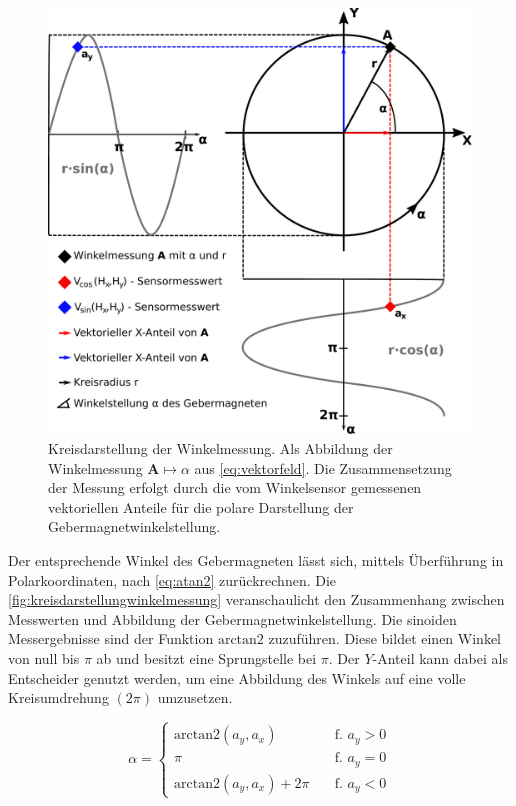 \clearpage


\begin{figure}[tph]
	\centering
	\includegraphics[width=0.7\linewidth]{chapters/images/2-Grundlagen/Kreisdarstellung_Winkelmessung}
	\caption[Kreisdarstellung der Winkelmessung]{Kreisdarstellung der Winkelmessung. Als Abbildung der
		Winkelmessung $\mathbf{A}\mapsto\alpha$ aus	\autoref{eq:vektorfeld}. Die Zusammensetzung der Messung erfolgt 
		durch die vom Winkelsensor gemessenen vektoriellen Anteile für die polare Darstellung der 
		Gebermagnetwinkelstellung.}
	\label{fig:kreisdarstellungwinkelmessung}
\end{figure}

Der entsprechende Winkel des Gebermagneten lässt sich, mittels Überführung in Polarkoordinaten, nach \autoref{eq:atan2} 
zurückrechnen. Die \autoref{fig:kreisdarstellungwinkelmessung} veranschaulicht den Zusammenhang zwischen Messwerten und 
Abbildung der Gebermagnetwinkelstellung. Die sinoiden Messergebnisse sind der Funktion $\text{arctan2}$ zuzuführen. 
Diese bildet einen Winkel von null bis $\pi$ ab und besitzt eine Sprungstelle bei $\pi$. Der $Y$-Anteil kann dabei 
als Entscheider genutzt werden, um eine Abbildung des Winkels auf eine volle Kreisumdrehung $(2\pi)$ umzusetzen. 


\begin{equation}\label{eq:atan2}
\alpha = 
	\begin{cases}
	\text{arctan2}(a_y,a_x)        &\quad \textrm{f. } a_y > 0 \\
	\pi							   &\quad \textrm{f. } a_y = 0 \\
	\text{arctan2}(a_y,a_x) + 2\pi &\quad \textrm{f. } a_y < 0
	\end{cases}
\end{equation}
